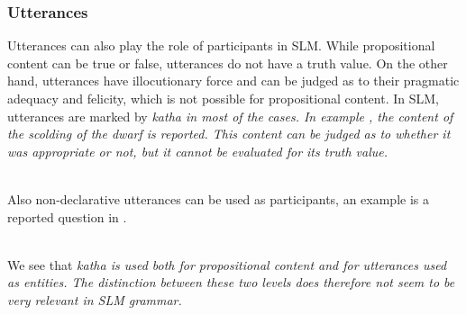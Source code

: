 \subsubsection{Utterances}\label{sec:func:Utterances}
Utterances can also play the role of participants in SLM.   While propositional content can be true or false, utterances do not have a truth value. On the other hand, utterances have illocutionary force and can be judged as to their pragmatic adequacy and felicity, which is not possible for propositional content. In SLM, utterances are marked by \em katha \em in most of the cases. In example , the content of the scolding of the dwarf is reported. This content can be judged as to whether it was appropriate or not, but it cannot be evaluated for its truth value.

\\

Also non-declarative utterances can be used as participants, an example is a reported question in .

 \\
We see that \em katha \em is used both for propositional content and for utterances used as entities. The distinction between these two levels does  therefore not seem to be very relevant in SLM grammar.

